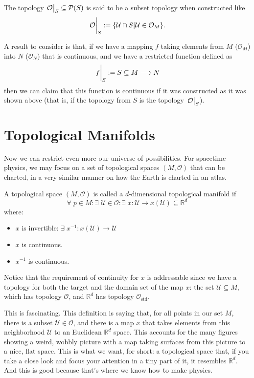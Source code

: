 \begin{definition}
    The topology $\eval{\mathcal{O}}_{S} \subseteq \mathcal{P}(S)$ is said to be a subset topology when constructed like
    \[
        \eval{\mathcal{O}}_{S} := \{ \mathcal{U} \cap S | \mathcal{U} \in \mathcal{O}_M \}.
    \]
\end{definition}

A result to consider is that, if we have a mapping $f$ taking elements from $M$ ($\mathcal{O}_M$) into $N$ ($\mathcal{O}_N$) that is continuous, and we have a restricted function defined as
\[
    \eval{f}_{S} := S \subseteq M \longrightarrow N
\]
then we can claim that this function is continuous if it was constructed as it was shown above (that is, if the topology from $S$ is the topology $\eval{\mathcal{O}}_{S}$).

\section{Topological Manifolds}
Now we can restrict even more our universe of possibilities. For spacetime physics, we may focus on a set of topological spaces $(M, \mathcal{O})$ that can be charted, in a very similar manner on how the Earth is charted in an atlas.

\begin{definition}
    A topological space $(M, \mathcal{O})$ is called a $d$-dimensional topological manifold if 
    \[
        \forall \; p \in M : \exists \; \mathcal{U} \in \mathcal{O} : \exists \; x : \mathcal{U} \longrightarrow x(\mathcal{U}) \subseteq \mathbb{R}^d
    \]
    where:
    \begin{itemize}
        \item $x$ is invertible: $\exists \; x^{-1}: x(\mathcal{U}) \longrightarrow \mathcal{U}$
        \item $x$ is continuous.
        \item $x^{-1}$ is continuous.
    \end{itemize}
\end{definition}

Notice that the requirement of continuity for $x$ is addressable since  we have a topology for both the target and the domain set of the map $x$: the set $\mathcal{U} \subseteq M$, which has topology $\mathcal{O}$, and $\mathbb{R}^d$ has topology $\mathcal{O}_{\text{std}}$.

This is fascinating. This definition is saying that, for all points in our set $M$, there is a subset $\mathcal{U} \in \mathcal{O}$, and there is a map $x$ that takes elements from this neighborhood $\mathcal{U}$ to an Euclidean $\mathbb{R}^d$ space. This accounts for the many figures showing a weird, wobbly picture with a map taking surfaces from this picture to a nice, flat space. This is what we want, for short: a topological space that, if you take a close look and focus your attention in a tiny part of it, it resembles $\mathbb{R}^d$. And this is good because that's where we know how to make physics.

